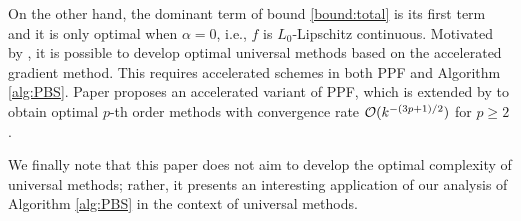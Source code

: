 \documentclass[11pt,letterpaper]{article}
\newcommand{\lam}{{\lambda}}
\begin{document}
On the other hand, the dominant term of bound \eqref{bound:total} is its first term and it is only optimal when $\alpha=0$, i.e., $f$ is $L_0$-Lipschitz continuous. Motivated by \cite{nemirovskii1985optimal}, it is possible to develop optimal universal methods based on the accelerated gradient method.
This requires accelerated schemes in both PPF and Algorithm \ref{alg:PBS}.
Paper \cite{MonteiroSvaiterAcceleration} proposes an accelerated variant of PPF, which is extended by \cite{bubeck2019near,jiang2019optimal,gasnikov2019optimal} to obtain optimal $p$-th order methods with convergence rate ${\cal O}(k^{-(3p+1)/2})$ for $p\ge 2$.

We finally note that this paper does not aim to develop the optimal complexity of universal methods; rather, it presents an interesting application of our analysis of Algorithm \ref{alg:PBS} in the context of universal methods.






\end{document}
